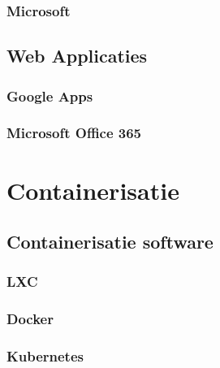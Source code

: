 \documentclass[a4paper,12pt,twoside,openright,titlepage]{book}
\begin{document}
\subsection{Microsoft}

\section{Web Applicaties}

\subsection{Google Apps}
\subsection{Microsoft Office 365}

\chapter{Containerisatie}
\section{Containerisatie software}
\subsection{LXC}
\subsection{Docker}
\subsection{Kubernetes}

\printindex
\end{document}
